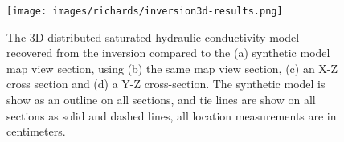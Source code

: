 \begin{figure}[ht]
\begin{center}
\texttt{[image: images/richards/inversion3d-results.png]}
\end{center}
\caption{The 3D distributed saturated hydraulic conductivity model recovered from the inversion compared to the (a) synthetic model map view section, using (b) the same map view section, (c) an X-Z cross section and (d) a Y-Z cross-section. The synthetic model is show as an outline on all sections, and tie lines are show on all sections as solid and dashed lines, all location measurements are in centimeters.}
\label{fig:richards-inversion3d-results}
\end{figure}
